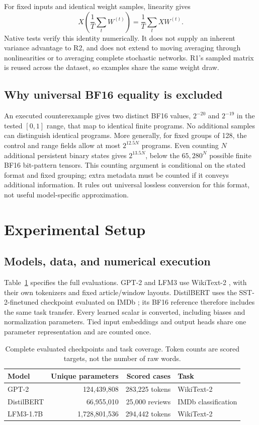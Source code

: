 \documentclass[11pt]{article}
\begin{document}
For fixed inputs and identical weight samples, linearity gives
\begin{equation}
 X\left(\frac1T\sum_t W^{(t)}\right)=\frac1T\sum_t XW^{(t)}.
 \label{eq:linearity}
\end{equation}
Native tests verify this identity numerically. It does not supply an inherent variance advantage to R2, and does not extend to moving averaging through nonlinearities or to averaging complete stochastic networks. R1's sampled matrix is reused across the dataset, so examples share the same weight draw.

\subsection{Why universal BF16 equality is excluded}
An executed counterexample gives two distinct BF16 values, $2^{-20}$ and $2^{-19}$ in the tested $[0,1]$ range, that map to identical finite programs. No additional samples can distinguish identical programs. More generally, for fixed groups of 128, the control and range fields allow at most $2^{12.5N}$ programs. Even counting $N$ additional persistent binary states gives $2^{13.5N}$, below the $65{,}280^N$ possible finite BF16 bit-pattern tensors. This counting argument is conditional on the stated format and fixed grouping; extra metadata must be counted if it conveys additional information. It rules out universal lossless conversion for this format, not useful model-specific approximation.

\section{Experimental Setup}
\subsection{Models, data, and numerical execution}
Table~\ref{tab:models} specifies the full evaluations. GPT-2 \citep{radford2019} and LFM3 \citep{liquid2026} use WikiText-2 \citep{merity2016}, with their own tokenizers and fixed article/window layouts. DistilBERT \citep{sanh2019} uses the SST-2-finetuned checkpoint evaluated on IMDb \citep{maas2011}; its BF16 reference therefore includes the same task transfer. Every learned scalar is converted, including biases and normalization parameters. Tied input embeddings and output heads share one parameter representation and are counted once.

\begin{table}[!htbp]\centering\small
\caption{Complete evaluated checkpoints and task coverage. Token counts are scored targets, not the number of raw words.}\label{tab:models}
\begin{tabular}{lrrl}\toprule
Model & Unique parameters & Scored cases & Task\\\midrule
GPT-2 & 124,439,808 & 283,225 tokens & WikiText-2\\
DistilBERT & 66,955,010 & 25,000 reviews & IMDb classification\\
LFM3-1.7B & 1,728,801,536 & 294,442 tokens & WikiText-2\\\bottomrule
\end{tabular}
\end{table}
\end{document}
